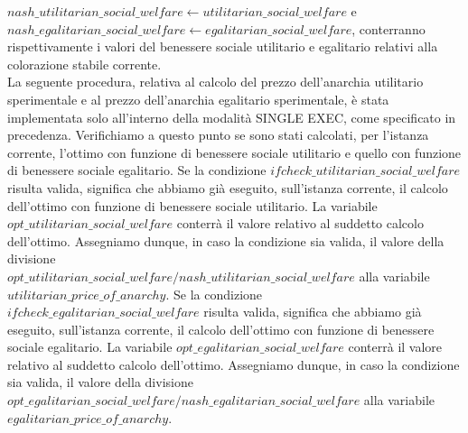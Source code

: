 $nash\_utilitarian\_social\_welfare\gets utilitarian\_social\_welfare$ e \\
$nash\_egalitarian\_social\_welfare\gets egalitarian\_social\_welfare$, conterranno rispettivamente i valori del benessere sociale utilitario e egalitario relativi alla colorazione stabile corrente.\\
La seguente procedura, relativa al calcolo del prezzo dell'anarchia utilitario sperimentale e al prezzo dell'anarchia egalitario sperimentale, è stata implementata solo all'interno della modalità SINGLE EXEC, come specificato in precedenza. Verifichiamo a questo punto se sono stati calcolati, per l'istanza corrente, l'ottimo con funzione di benessere sociale utilitario e quello con funzione di benessere sociale egalitario. Se la condizione $if check\_utilitarian\_social\_welfare$ risulta valida, significa che abbiamo già eseguito, sull'istanza corrente, il calcolo dell'ottimo con funzione di benessere sociale utilitario. La variabile $opt\_utilitarian\_social\_welfare$ conterrà il valore relativo al suddetto calcolo dell'ottimo. Assegniamo dunque, in caso la condizione sia valida, il valore della divisione \\
$opt\_utilitarian\_social\_welfare / nash\_utilitarian\_social\_welfare$ alla variabile $utilitarian\_price\_of\_anarchy$. Se la condizione\\
$if check\_egalitarian\_social\_welfare$ risulta valida, significa che abbiamo già eseguito, sull'istanza corrente, il calcolo dell'ottimo con funzione di benessere sociale egalitario. La variabile $opt\_egalitarian\_social\_welfare$ conterrà il valore relativo al suddetto calcolo dell'ottimo. Assegniamo dunque, in caso la condizione sia valida, il valore della divisione\\
$opt\_egalitarian\_social\_welfare / nash\_egalitarian\_social\_welfare$ alla variabile $egalitarian\_price\_of\_anarchy$.

\newpage
